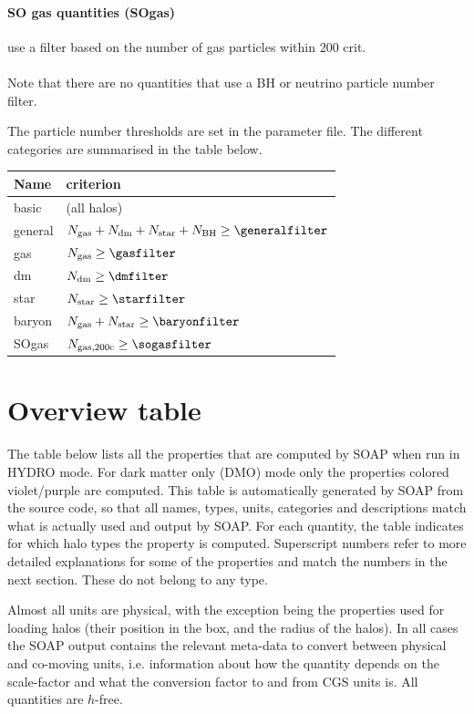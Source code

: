 \documentclass{article}
\begin{document}
\paragraph{SO gas quantities (SOgas)} use a filter based on the number of gas particles within 200 crit.

\paragraph{}Note that there are no quantities that use a BH or neutrino particle number filter.

The particle number thresholds are set in the parameter file. The different categories are summarised in the table below.

\begin{longtable}{ll}
Name & criterion \\
\hline{}basic & (all halos) \\
general & $N_{\rm{}gas}+N_{\rm{}dm}+N_{\rm{}star}+N_{\rm{}BH} \geq{} \generalfilter$ \\
gas & $N_{\rm{}gas} \geq{} \gasfilter$ \\
dm & $N_{\rm{}dm} \geq{} \dmfilter$ \\
star & $N_{\rm{}star} \geq{} \starfilter$ \\
baryon & $N_{\rm{}gas}+N_{\rm{}star} \geq{} \baryonfilter$ \\
SOgas & $N_{\rm{}gas, 200c} \geq{} \sogasfilter$ \\
\end{longtable}

\section{Overview table}

The table below lists all the properties that are computed by SOAP when run in HYDRO mode. 
For dark matter only (DMO) mode only the properties colored violet/purple are computed.
This table is automatically generated by 
SOAP from the source code, so that all names, types, units, categories and descriptions match what is actually 
used and output by SOAP. For each quantity, the table indicates for which halo types the property is computed. 
Superscript numbers refer to more detailed explanations for some of the properties and match the numbers in 
the next section. These do not belong to 
any type. 

Almost all units are physical, with the exception being the properties used for loading halos (their position
in the box, and the radius of the halos). In all cases the SOAP output contains the relevant meta-data to 
convert between physical and co-moving units, i.e. information about how the quantity depends on the 
scale-factor and what the conversion factor to and from CGS units is. All quantities are $h$-free.
\end{document}
